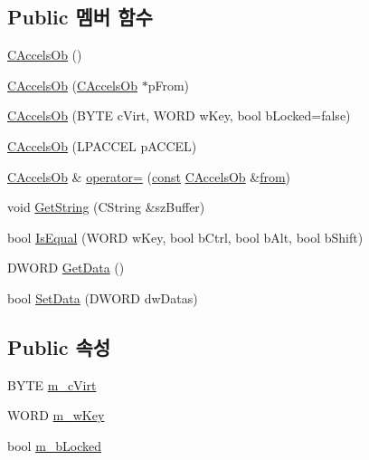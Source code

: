 \subsection*{Public 멤버 함수}
\begin{DoxyCompactItemize}
\item 
\mbox{\hyperlink{class_c_accels_ob_a6245b2db041ed3ba0aec609bbb1654cf}{C\+Accels\+Ob}} ()
\item 
\mbox{\hyperlink{class_c_accels_ob_afca345908aafde57de46430bbf2018d9}{C\+Accels\+Ob}} (\mbox{\hyperlink{class_c_accels_ob}{C\+Accels\+Ob}} $\ast$p\+From)
\item 
\mbox{\hyperlink{class_c_accels_ob_acba35eec2e75114289468292870bf484}{C\+Accels\+Ob}} (B\+Y\+TE c\+Virt, W\+O\+RD w\+Key, bool b\+Locked=false)
\item 
\mbox{\hyperlink{class_c_accels_ob_aa28d7238be643bb20d922cb360881bd6}{C\+Accels\+Ob}} (L\+P\+A\+C\+C\+EL p\+A\+C\+C\+EL)
\item 
\mbox{\hyperlink{class_c_accels_ob}{C\+Accels\+Ob}} \& \mbox{\hyperlink{class_c_accels_ob_ae6075be9ad7656823f5cecd277dd7d6e}{operator=}} (\mbox{\hyperlink{getopt1_8c_a2c212835823e3c54a8ab6d95c652660e}{const}} \mbox{\hyperlink{class_c_accels_ob}{C\+Accels\+Ob}} \&\mbox{\hyperlink{expr_8cpp_a765533dfc643627999c751f7e1514664}{from}})
\item 
void \mbox{\hyperlink{class_c_accels_ob_afaf7510fa1e0707863f6bd469f190de6}{Get\+String}} (C\+String \&sz\+Buffer)
\item 
bool \mbox{\hyperlink{class_c_accels_ob_a32714a4454d398d3d3a68d1705a76bc5}{Is\+Equal}} (W\+O\+RD w\+Key, bool b\+Ctrl, bool b\+Alt, bool b\+Shift)
\item 
D\+W\+O\+RD \mbox{\hyperlink{class_c_accels_ob_abbbdc5e93061f67ade785c9e4f07b918}{Get\+Data}} ()
\item 
bool \mbox{\hyperlink{class_c_accels_ob_a47a1e7e047807b7a36553aa351768096}{Set\+Data}} (D\+W\+O\+RD dw\+Datas)
\end{DoxyCompactItemize}
\subsection*{Public 속성}
\begin{DoxyCompactItemize}
\item 
B\+Y\+TE \mbox{\hyperlink{class_c_accels_ob_a08b7003ccf92c6afcf31878960d8eee1}{m\+\_\+c\+Virt}}
\item 
W\+O\+RD \mbox{\hyperlink{class_c_accels_ob_a1891250e9a4d00c0862f3a90a965d635}{m\+\_\+w\+Key}}
\item 
bool \mbox{\hyperlink{class_c_accels_ob_ad8300bd20bd429ad61f89700e388dd9a}{m\+\_\+b\+Locked}}
\end{DoxyCompactItemize}


